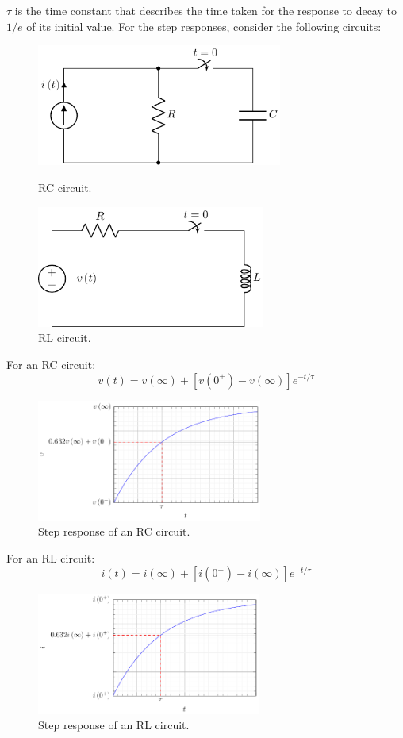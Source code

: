 \documentclass{article}
\begin{document}
\(\tau\) is the time constant that describes the time taken for the
response to decay to \(1/e\) of its initial value. For the step
responses, consider the following circuits:
\begin{figure}[H]
    \centering
    \includegraphics[height = 4cm]{figures/rc_step.pdf}
    \caption{RC circuit.} %
    \includegraphics[height = 4cm]{figures/rl_step.pdf}
    \caption{RL circuit.} %
\end{figure}
For an RC circuit:
\begin{equation*}
    v\left( t \right) = v\left( \infty \right) + \left[ v\left( 0^{+} \right) - v\left( \infty \right) \right] e^{-t/\tau}
\end{equation*}
\begin{figure}[H]
    \centering
    \includegraphics[height = 4cm]{figures/rc_step_plot.pdf}
    \caption{Step response of an RC circuit.} %
\end{figure}
For an RL circuit:
\begin{equation*}
    i\left( t \right) = i\left( \infty \right) + \left[ i\left( 0^{+} \right) - i\left( \infty \right) \right] e^{-t/\tau}
\end{equation*}
\begin{figure}[H]
    \centering
    \includegraphics[height = 4cm]{figures/rl_step_plot.pdf}
    \caption{Step response of an RL circuit.} %
\end{figure}
\end{document}
